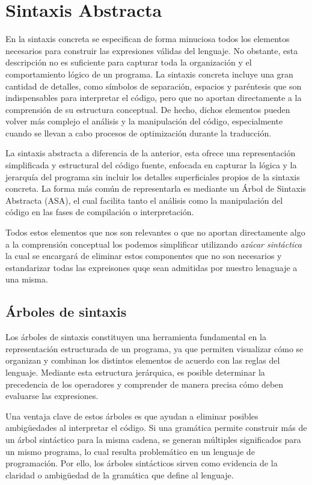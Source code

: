 \documentclass[a4paper,12pt]{article}
\begin{document}
\section{Sintaxis Abstracta}
En la sintaxis concreta se especifican de forma minuciosa todos los elementos necesarios para construir las expresiones válidas del lenguaje. No obstante, esta descripción no es suficiente para capturar toda la organización y el comportamiento lógico de un programa. La sintaxis concreta incluye una gran cantidad de detalles, como símbolos de separación, espacios y paréntesis que son indispensables para interpretar el código, pero que no aportan directamente a la comprensión de su estructura conceptual. De hecho, dichos elementos pueden volver más complejo el análisis y la manipulación del código, especialmente cuando se llevan a cabo procesos de optimización durante la traducción.

La sintaxis abstracta a diferencia de la
anterior, esta ofrece una representación simplificada y estructural del código fuente, enfocada en capturar
la lógica y la jerarquía del programa sin incluir los detalles superficiales propios de la sintaxis concreta. La forma más común de representarla es mediante un Árbol de Sintaxis Abstracta (ASA), el cual facilita tanto el análisis como la manipulación del código en las fases de compilación o interpretación.

Todos estos elementos que nos son relevantes o que no aportan directamente algo a la comprensión conceptual los podemos simplificar utilizando \textit{azúcar sintáctica} la cual se encargará de eliminar estos componentes que no son necesarios y estandarizar todas las expreisones quqe sean admitidas por nuestro lenaguaje a una misma.\cite{LambdaSpace05,UNAMMaterial,UNAMTesis}

\subsection{Árboles de sintaxis}

Los árboles de sintaxis constituyen una herramienta fundamental en la representación estructurada de un programa, ya que permiten visualizar cómo se organizan y combinan los distintos elementos de acuerdo con las reglas del lenguaje. Mediante esta estructura jerárquica, es posible determinar la precedencia de los operadores y comprender de manera precisa cómo deben evaluarse las expresiones.

Una ventaja clave de estos árboles es que ayudan a eliminar posibles ambigüedades al interpretar el código. Si una gramática permite construir más de un árbol sintáctico para la misma cadena, se generan múltiples significados para un mismo programa, lo cual resulta problemático en un lenguaje de programación. Por ello, los árboles sintácticos sirven como evidencia de la claridad o ambigüedad de la gramática que define al lenguaje.
\end{document}
